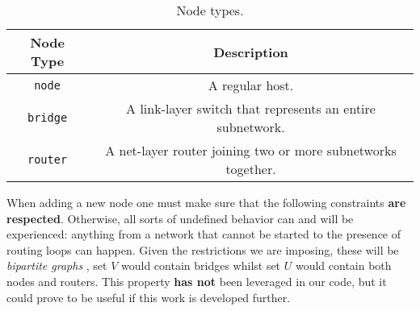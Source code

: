                 \begin{table}
                    \centering
                    \begin{tabular}{|c|c|}
                        \hline
                        \textbf{Node Type} & \textbf{Description}\\
                        \hline
                        \texttt{node} & A regular host.\\
                        \hline
                        \texttt{bridge} & A link-layer switch that represents an entire subnetwork.\\
                        \hline
                        \texttt{router} & A net-layer router joining two or more subnetworks together.\\
                        \hline
                    \end{tabular}
                    \caption{Node types.}
                    \label{tab:node-types}
                \end{table}

                When adding a new node one must make sure that the following constraints \textbf{are respected}. Otherwise, all sorts of undefined behavior can and will be experienced: anything from a network that cannot be started to the presence of routing loops can happen. Given the restrictions we are imposing, these will be \textit{bipartite graphs} \cite{bib:bipartite-graphs}, set $V$ would contain bridges whilst set $U$ would contain both nodes and routers. This property \textbf{has not} been leveraged in our code, but it could prove to be useful if this work is developed further.\\

